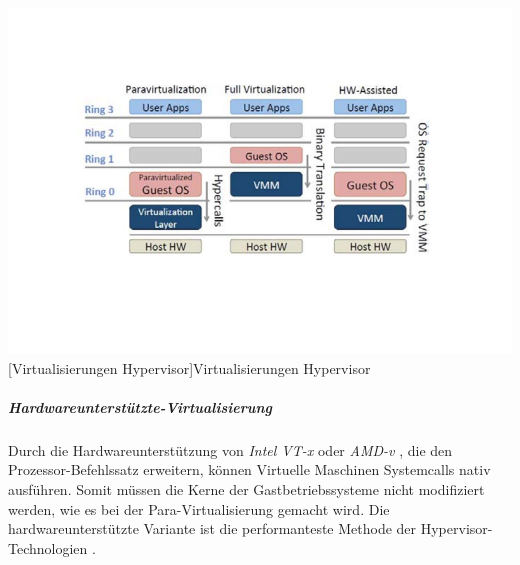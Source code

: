 \vspace{1em}
\begin{minipage}{\linewidth}
	\centering
	\includegraphics[width=1\linewidth]{pics/02Virtualisierungen_Hypervisor.PNG}
	[Virtualisierungen Hypervisor]{Virtualisierungen Hypervisor \cite{Fayyad-Kazan2013BenchmarkingHypervisors}}
	\label{fig:Virtualisierungen_Hypervisor}
\end{minipage}
 
\subparagraph{Hardwareunterstützte-Virtualisierung}
Durch die Hardwareunterstützung von \emph{Intel VT-x} \cite{TechnologyIntel} oder \emph{AMD-v} \cite{AMDVirtualisierungstechnologie}, die den Prozessor-Befehlssatz erweitern, können Virtuelle Maschinen Systemcalls nativ ausführen. Somit müssen die Kerne der Gastbetriebssysteme nicht modifiziert werden, wie es bei der Para-Virtualisierung gemacht wird. Die hardwareunterstützte Variante ist die performanteste Methode der Hypervisor-Technologien \cite{Meinel2011VirtualisierungMarktubersicht}.




